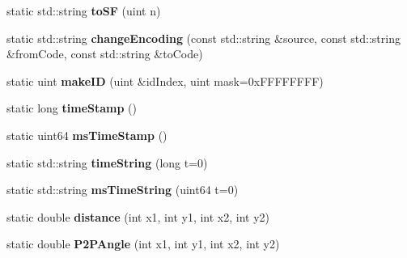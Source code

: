 \begin{DoxyCompactItemize}
\item 
\hypertarget{classmm_1_1_game_utils_a00c9d555eb5579317ca9e5d45bd2c548}{}static std\+::string {\bfseries to\+S\+F} (uint n)\label{classmm_1_1_game_utils_a00c9d555eb5579317ca9e5d45bd2c548}

\item 
\hypertarget{classmm_1_1_game_utils_aab9fe722279704cb7544a04a6027cccc}{}static std\+::string {\bfseries change\+Encoding} (const std\+::string \&source, const std\+::string \&from\+Code, const std\+::string \&to\+Code)\label{classmm_1_1_game_utils_aab9fe722279704cb7544a04a6027cccc}

\item 
\hypertarget{classmm_1_1_game_utils_ae6ee9cb4d479d5239ad1d843e1c9d0fd}{}static uint {\bfseries make\+I\+D} (uint \&id\+Index, uint mask=0x\+F\+F\+F\+F\+F\+F\+F\+F)\label{classmm_1_1_game_utils_ae6ee9cb4d479d5239ad1d843e1c9d0fd}

\item 
\hypertarget{classmm_1_1_game_utils_aed4dbd305d1dce87a586ba094a6d5cde}{}static long {\bfseries time\+Stamp} ()\label{classmm_1_1_game_utils_aed4dbd305d1dce87a586ba094a6d5cde}

\item 
\hypertarget{classmm_1_1_game_utils_aafda084db416548d59fac50342584169}{}static uint64 {\bfseries ms\+Time\+Stamp} ()\label{classmm_1_1_game_utils_aafda084db416548d59fac50342584169}

\item 
\hypertarget{classmm_1_1_game_utils_a7b22255b7f41daccf69e9ba4f0eae5cb}{}static std\+::string {\bfseries time\+String} (long t=0)\label{classmm_1_1_game_utils_a7b22255b7f41daccf69e9ba4f0eae5cb}

\item 
\hypertarget{classmm_1_1_game_utils_a52e35ff5c36fa9db64652a44b52369ba}{}static std\+::string {\bfseries ms\+Time\+String} (uint64 t=0)\label{classmm_1_1_game_utils_a52e35ff5c36fa9db64652a44b52369ba}

\item 
\hypertarget{classmm_1_1_game_utils_a03f45f460b5e9d6b833eaa60295f160e}{}static double {\bfseries distance} (int x1, int y1, int x2, int y2)\label{classmm_1_1_game_utils_a03f45f460b5e9d6b833eaa60295f160e}

\item 
\hypertarget{classmm_1_1_game_utils_a983731ec0aa94bb60acad4fb9cf1f12b}{}static double {\bfseries P2\+P\+Angle} (int x1, int y1, int x2, int y2)\label{classmm_1_1_game_utils_a983731ec0aa94bb60acad4fb9cf1f12b}


\end{DoxyCompactItemize}
